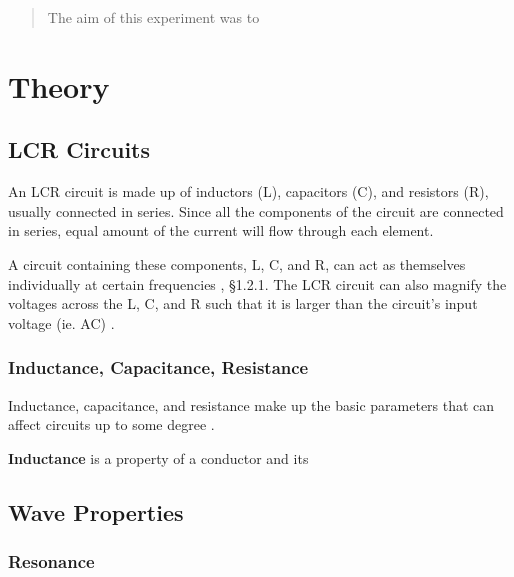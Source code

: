 \documentclass[12pt]{article}
\begin{document}
\begin{abstract}

The aim of this experiment was to



\end{abstract}




\section{Theory}

\subsection{LCR Circuits}
An LCR circuit is made up of inductors (L), capacitors (C), and resistors (R), usually connected in series.
Since all the components of the circuit are connected in series, equal amount of the current will flow through each element.
\cite{unacademy}

A circuit containing these components, L, C, and R, can act as themselves individually at certain frequencies
\cite{learnabout}, §1.2.1.
The LCR circuit can also magnify the voltages across the L, C, and R such that it is larger than the  circuit's input voltage (ie. AC)
\cite{learnabout}.

\subsubsection{Inductance, Capacitance, Resistance}

Inductance, capacitance, and resistance make up the basic parameters that can affect circuits up to some degree
\cite{elecnotes}.

\textbf{Inductance} is a property of a conductor and its 
\cite{britinductance}


\subsection{Wave Properties}





\subsubsection{Resonance}
\end{document}
